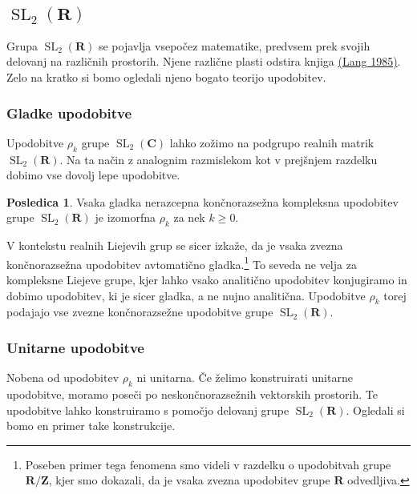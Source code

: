 \documentclass[11pt]{book}
\def\ZZ{\mathbf{Z}}
\def\RR{\mathbf{R}}
\def\CC{\mathbf{C}}
\DeclareMathOperator\SL{SL}
\theoremstyle{definition}
\theoremstyle{zgled}
\theoremstyle{odprtproblem}
\theoremstyle{domacanaloga}
\theoremstyle{izrek}
\newtheorem*{posledica}{Posledica}
\begin{document}
\subsection{$\SL_2(\RR)$}

Grupa $\SL_2(\RR)$ se pojavlja vsepočez matematike, predvsem prek svojih delovanj na različnih prostorih. Njene različne plasti odstira knjiga \href{https://link.springer.com/book/10.1007/978-1-4612-5142-2}{(Lang 1985)}. Zelo na kratko si bomo ogledali njeno bogato teorijo upodobitev.

\subsubsection{Gladke upodobitve}

Upodobitve $\rho_k$ grupe $\SL_2(\CC)$ lahko zožimo na podgrupo realnih matrik $\SL_2(\RR)$. Na ta način z analognim razmislekom kot v prejšnjem razdelku dobimo vse dovolj lepe upodobitve. 

\begin{posledica}
Vsaka gladka nerazcepna končnorazsežna kompleksna upodobitev grupe $\SL_2(\RR)$ je izomorfna $\rho_k$ za nek $k \geq 0$.
\end{posledica}

V kontekstu realnih Liejevih grup se sicer izkaže, da je vsaka zvezna končnorazsežna upodobitev avtomatično gladka.\footnote{Poseben primer tega fenomena smo videli v razdelku o upodobitvah grupe $\RR/\ZZ$, kjer smo dokazali, da je vsaka zvezna upodobitev grupe $\RR$ odvedljiva.} To seveda ne velja za kompleksne Liejeve grupe, kjer lahko vsako analitično upodobitev konjugiramo in dobimo upodobitev, ki je sicer gladka, a ne nujno analitična. Upodobitve $\rho_k$ torej podajajo vse zvezne končnorazsežne upodobitve grupe $\SL_2(\RR)$. 

\subsubsection{Unitarne upodobitve}

Nobena od upodobitev $\rho_k$ ni unitarna. Če želimo konstruirati unitarne upodobitve, moramo poseči po neskončnorazsežnih vektorskih prostorih. Te upodobitve lahko konstruiramo s pomočjo delovanj grupe $\SL_2(\RR)$. Ogledali si bomo en primer take konstrukcije.
\end{document}
